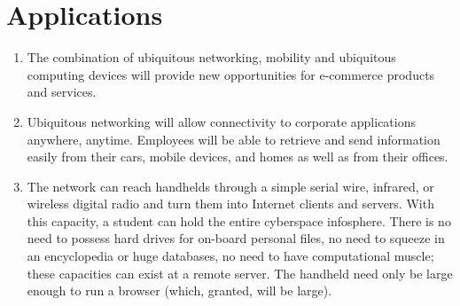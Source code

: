 \documentclass[12pt]{report}
\begin{document}
\chapter{Applications}
\begin{enumerate}
\item The combination of ubiquitous networking, mobility and ubiquitous computing devices will provide new opportunities for e-commerce products and services.
\item Ubiquitous networking will allow connectivity to corporate applications anywhere, anytime. Employees will be able to retrieve and send information easily from their cars, mobile devices, and homes as well as from their offices.
\item The network can reach handhelds through a simple serial wire, infrared, or wireless digital radio and turn them into Internet clients and servers. With this capacity, a student can hold the entire cyberspace infosphere. There is no need to possess hard drives for on-board personal files, no need to squeeze in an encyclopedia or huge databases, no need to have computational muscle; these capacities can exist at a remote server. The handheld need only be large enough to run a browser (which, granted, will be large).
\end{enumerate}\\
\end{document}
